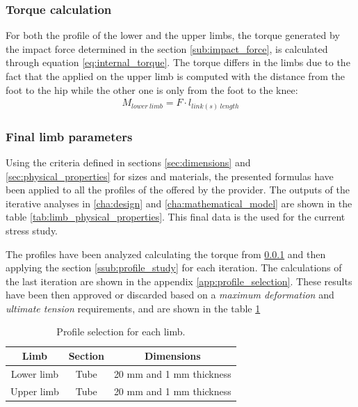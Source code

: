 \subsubsection{Torque calculation} %
\label{ssub:torque_calculation}
  For both the profile of the lower and the upper limbs, the torque generated by the impact force determined in the section \ref{sub:impact_force}, is calculated through equation \ref{eq:internal_torque}.
  The torque differs in the limbs due to the fact that the applied on the upper limb is computed with the distance from the foot to the hip while the other one is only from the foot to the knee:
  \begin{equation}
  \begin{aligned}
  \label{eq:internal_torque}
     M_{lower\ limb} = F \cdot l_{link(s)\ length}
  \end{aligned}
  \end{equation}

\subsubsection{Final limb parameters} %
\label{ssub:final_limb_parameters}
Using the criteria defined in sections \ref{sec:dimensions} and \ref{sec:physical_properties} for sizes and materials, the presented formulas have been applied to all the profiles of the offered by the provider.
The outputs of the iterative analyses in \ref{cha:design} and \ref{cha:mathematical_model} are shown in the table \ref{tab:limb_physical_properties}. 
This final data is the used for the current stress study.

The profiles have been analyzed calculating the torque from \ref{ssub:torque_calculation} and then applying the section \ref{ssub:profile_study} for each iteration.
The calculations of the last iteration are shown in the appendix \ref{app:profile_selection}.
These results have been then approved or discarded based on a \textit{maximum deformation} and \textit{ultimate tension} requirements, and are shown in the table \ref{tab:profile_selection}

\begin{table}[ht!]
\centering
\caption{Profile selection for each limb.}
\label{tab:profile_selection}
\begin{tabular}{c|c|c}
  \textbf{Limb} & \textbf{Section} & \textbf{Dimensions} \\ \hline
  Lower limb & Tube & 20 mm and 1 mm thickness \\ \hline
  Upper limb & Tube & 20 mm and 1 mm thickness 
\end{tabular}
\end{table}




